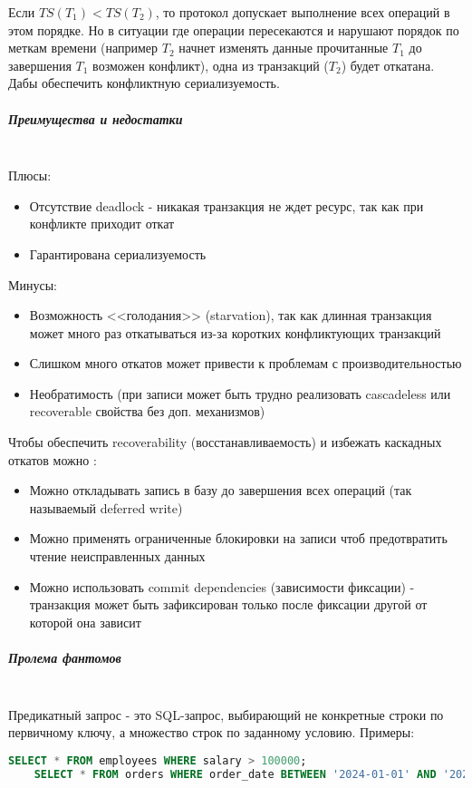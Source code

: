 Если $TS(T_1) < TS(T_2)$, то протокол допускает выполнение всех операций в этом порядке. Но в ситуации где операции пересекаются и нарушают порядок по меткам времени (например $T_2$ начнет изменять данные прочитанные $T_1$ до завершения $T_1$ \textrightarrow возможен конфликт), одна из транзакций ($T_2$) будет откатана. Дабы обеспечить конфликтную сериализуемость.

\subparagraph{Преимущества и недостатки} ~\\

Плюсы:
\begin{itemize}
    \item Отсутствие deadlock - никакая транзакция не ждет ресурс, так как при конфликте приходит откат
    \item Гарантирована сериализуемость
\end{itemize}

Минусы:
\begin{itemize}
    \item Возможность <<голодания>> (starvation), так как длинная транзакция может много раз откатываться из-за коротких конфликтующих транзакций
    \item Слишком много откатов может привести к проблемам с производительностью
    \item Необратимость (при записи может быть трудно реализовать cascadeless или recoverable свойства без доп. механизмов) \autocite{Silberschatz}
\end{itemize}

Чтобы обеспечить recoverability (восстанавливаемость) и избежать каскадных откатов можно \autocite{Silberschatz, ElmasriNavathe}:
\begin{itemize}
    \item Можно откладывать запись в базу до завершения всех операций (так называемый deferred write)
    \item Можно применять ограниченные блокировки на записи чтоб предотвратить чтение неисправленных данных
    \item Можно использовать commit dependencies (зависимости фиксации) - транзакция может быть зафиксирован только после фиксации другой от которой она зависит
\end{itemize}

\subparagraph{Пролема фантомов} ~\\

Предикатный запрос - это SQL-запрос, выбирающий не конкретные строки по первичному ключу, а множество строк по заданному условию. Примеры:
\begin{lstlisting}[language=SQL]
    SELECT * FROM employees WHERE salary > 100000;
    SELECT * FROM orders WHERE order_date BETWEEN '2024-01-01' AND '2024-03-01';       
\end{lstlisting}

